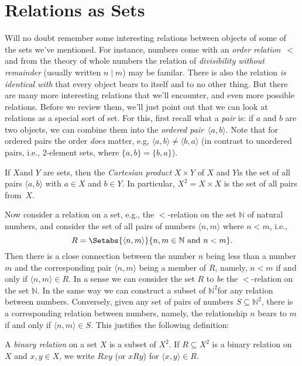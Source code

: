 \documentclass[open-logic-section]{subfiles}
\begin{document}
\section{Relations as Sets}

\begin{wordy}
Will no doubt remember some interesting relations between objects of
some of the sets we've mentioned. For instance, numbers come with an
\emph{order relation}~$<$ and from the theory of whole numbers the
relation of \emph{divisibility without remainder} (usually written
$n\mid m$) may be familar. There is also the relation \emph{is
  identical with} that every object bears to itself and to no other
thing. But there are many more interesting relations that we'll
encounter, and even more possible relations. Before we review them,
we'll just point out that we can look at relations as a special sort
of set. For this, first recall what a \emph{pair} is: if $a$ and $b$
are two objects, we can combine them into the \emph{ordered
  pair}~$\langle a,b\rangle$.  Note that for ordered pairs the order
\emph{does} matter, e.g, $\langle a,b\rangle \neq \langle b,a\rangle$
(in contrast to unordered pairs, i.e., 2-element sets, where
$\{a,b\}=\{b,a\}$).

If $X$and $Y$ are sets, then the \emph{Cartesian product} $X\times Y$
of $X$ and $Y$is the set of all pairs $\langle a,b\rangle$ with $a\in X$ and
$b\in Y$. In particular, $X^{2}=X\times X$ is the set of all pairs
from~$X$.

Now consider a relation on a set, e.g., the $<$-relation on the set
$\mathbb{N}$ of natural numbers, and consider the set of all pairs of
numbers $\langle n,m \rangle$ where $n<m$, i.e.,
\[
R=\Setabs{\langle n,m\rangle}{n,m\in\mathbb{N}\text{ and }n<m}.
\]
Then there is a close connection between the number $n$ being less
than a number $m$ and the corresponding pair $\langle n,m\rangle$
being a member of $R$, namely, $n<m$ if and only if $\langle n,m
\rangle\in R$. In a sense we can consider the set $R$ to \emph{be} the
$<$-relation on the set $\mathbb{N}$. In the same way we can construct
a subset of $\mathbb{N}^{2}$for any relation between
numbers. Conversely, given any set of pairs of numbers
$S\subseteq\mathbb{N}^{2}$, there is a corresponding relation between
numbers, namely, the relationship $n$ bears to $m$ if and only if
$\langle n,m \rangle\in S$. This justifies the following definition:
\end{wordy}

\begin{defn}
A \emph{binary relation} on a set $X$ is a subset of $X^{2}$. If
$R\subseteq X^{2}$ is a binary relation on~$X$ and $x,y\in X$,
we write $Rxy$ (or $xRy$) for $\langle x,y \rangle\in R$.
\end{defn}
\end{document}
